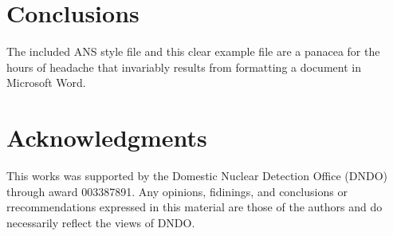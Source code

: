 \documentclass{anstrans}
\begin{document}
\section{Conclusions}

The included ANS style file and this clear example file are a panacea for
the hours of headache that invariably results from formatting a document in
Microsoft Word.


\section{Acknowledgments}
This works was supported by the Domestic Nuclear Detection Office (DNDO) through award 003387891.
Any opinions, fidinings, and conclusions or rrecommendations expressed in this material are those of the authors and do necessarily reflect the views of DNDO.



\end{document}
